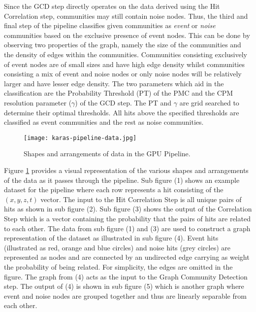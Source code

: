 Since the GCD step directly operates on the data derived using the Hit
Correlation step, communities may still contain noise nodes. Thus, the
third and final step of the pipeline classifies given communities as
\emph{event} or \emph{noise} communities based on the exclusive
presence of event nodes. This can be done by observing two properties
of the graph, namely the size of the communities and the density of
edges within the communities. Communities consisting exclusively of
event nodes are of small sizes and have high edge density whilst
communities consisting a mix of event and noise nodes or only noise
nodes will be relatively larger and have lesser edge density. The two
parameters which aid in the classification are the Probability
Threshold (PT) of the PMC and the CPM resolution parameter ($\gamma$)
of the GCD step. The PT and $\gamma$ are grid searched to determine
their optimal thresholds. All hits above the specified thresholds are
classified as event communities and the rest as noise communities.

\begin{figure}[htb]
  \centering
  \texttt{[image: karas-pipeline-data.jpg]}
  \caption{Shapes and arrangements of data in the GPU Pipeline.}
  \label{fig:karas-pipeline-data}
\end{figure}

Figure \ref{fig:karas-pipeline-data} provides a visual representation
of the various shapes and arrangements of the data as it passes
through the pipeline. Sub figure (1) shows an example dataset for the
pipeline where each row represents a hit consisting of the $(x, y, z,
t)$ vector. The input to the Hit Correlation Step is all unique pairs
of hits as shown in sub figure (2). Sub figure (3) shows the output of
the Correlation Step which is a vector containing the probability that
the pairs of hits are related to each other. The data from sub figure
(1) and (3) are used to construct a graph representation of the
dataset as illustrated in sub figure (4). Event hits (illustrated as
red, orange and blue circles) and noise hits (grey circles) are
represented as nodes and are connected by an undirected edge carrying
as weight the probability of being related. For simplicity, the edges
are omitted in the figure. The graph from (4) acts as the input to the
Graph Community Detection step. The output of (4) is shown in sub
figure (5) which is another graph where event and noise nodes are
grouped together and thus are linearly separable from each other.

